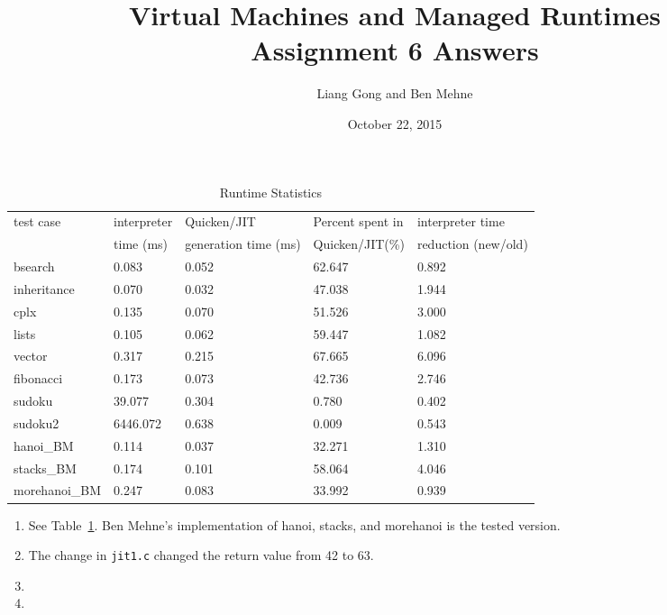 \documentclass[notitlepage]{report}
\title{\vspace{-0.5in}Virtual Machines and Managed Runtimes \\ Assignment 6 Answers}
\date{\vspace{-0.5in}October 22, 2015}
\author{\vspace{-0.5in}Liang Gong and Ben Mehne\vspace{-0.5in}}
\begin{document}
\maketitle

\begin{table}[!htp]
\centering
\caption{Runtime Statistics}
\label{statistics}
{\footnotesize
\begin{tabular}{lllll}
\toprule
test case & interpreter & Quicken/JIT           & Percent spent in  & interpreter time    \\
			 & time (ms)   & generation time (ms)  & Quicken/JIT(\%)   & reduction (new/old) \\
\midrule
bsearch        & 0.083          & 0.052          & 62.647     & 0.892    \\
inheritance    & 0.070          & 0.032          & 47.038     & 1.944    \\
cplx           & 0.135          & 0.070          & 51.526     & 3.000    \\
lists          & 0.105          & 0.062          & 59.447     & 1.082    \\
vector         & 0.317          & 0.215          & 67.665     & 6.096    \\
fibonacci      & 0.173          & 0.073          & 42.736     & 2.746    \\
sudoku         & 39.077         & 0.304          & 0.780      & 0.402    \\
sudoku2        & 6446.072       & 0.638          & 0.009      & 0.543    \\
hanoi\_BM      & 0.114          & 0.037          & 32.271     & 1.310    \\
stacks\_BM     & 0.174          & 0.101          & 58.064     & 4.046    \\
morehanoi\_BM  & 0.247          & 0.083          & 33.992     & 0.939    \\
\bottomrule
\end{tabular}
}
\end{table}

\begin{enumerate}
	\item [Report 11.1a-d]
		See Table~\ref{statistics}. Ben Mehne's implementation of hanoi, stacks, and morehanoi is the tested version.
	\item [Exercise 3.1.1]
		The change in \texttt{jit1.c} changed the return value from 42 to 63.
	\item [Exercise 4.1.1]
		
	\item [Exercise 4.1.2]
		

\end{enumerate}
\end{document}
